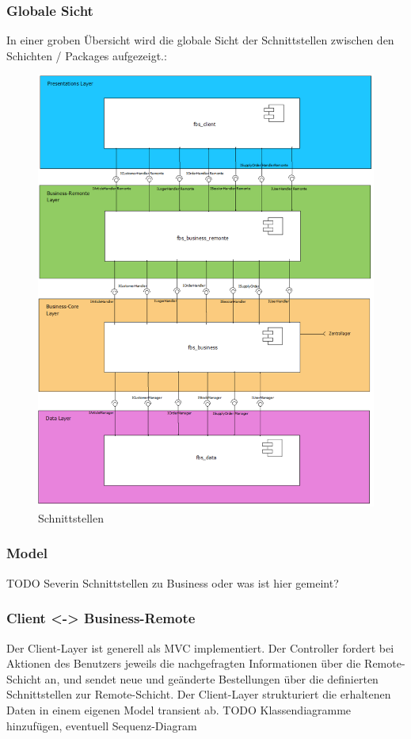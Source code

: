 \subsubsection{Globale Sicht}
In einer groben Übersicht wird die globale Sicht der Schnittstellen zwischen den Schichten / Packages aufgezeigt.:\\
\begin{figure}[H]
\centering
	\includegraphics[width=1.0\linewidth]{Images/Schnittstellen}
	\caption{Schnittstellen}
	\label{fig:schnittstellen}
\end{figure}

\subsubsection{Model}
TODO Severin Schnittstellen zu Business oder was ist hier gemeint?

\subsubsection{Client <-> Business-Remote}
Der Client-Layer ist generell als MVC implementiert. Der Controller fordert bei Aktionen des Benutzers jeweils die nachgefragten Informationen über die Remote-Schicht an, und sendet neue und geänderte Bestellungen über die definierten Schnittstellen zur Remote-Schicht.
Der Client-Layer strukturiert die erhaltenen Daten in einem eigenen Model transient ab.
TODO Klassendiagramme hinzufügen, eventuell Sequenz-Diagram

